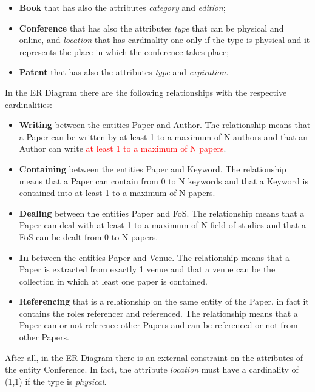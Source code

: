 \documentclass{Configuration_Files/PoliMi3i_thesis}
\begin{document}
\begin{itemize}
\begin{itemize}
            \item \textbf{Book} that has also the attributes \textit{category} and \textit{edition};
            \item \textbf{Conference} that has also the attributes \textit{type} that can be physical and online, and \textit{location} that has cardinality one only if the type is physical and it represents the place in which the conference takes place;
            \item \textbf{Patent} that has also the attributes \textit{type} and \textit{expiration}.
        \end{itemize}
\end{itemize}

In the ER Diagram there are the following relationships with the respective cardinalities:
\begin{itemize}
    \item \textbf{Writing} between the entities Paper and Author. The relationship means that a Paper can be written by at least 1 to a maximum of N authors and that an Author can write \textcolor{red}{at least 1 to a maximum of N papers}.
    \item \textbf{Containing} between the entities Paper and Keyword. The relationship means that a Paper can contain from 0 to N keywords and that a Keyword is contained into at least 1 to a maximum of N papers.
    \item \textbf{Dealing} between the entities Paper and FoS. The relationship means that a Paper can deal with at least 1 to a maximum of N field of studies and that a FoS can be dealt from 0 to N papers. 
    \item \textbf{In} between the entities Paper and Venue. The relationship means that a Paper is extracted from exactly 1 venue and that a venue can be the collection in which at least one paper is contained.
    \item \textbf{Referencing} that is a relationship on the same entity of the Paper, in fact it contains the roles referencer and referenced. The relationship means that a Paper can or not reference other Papers and can be referenced or not from other Papers.
\end{itemize}
After all, in the ER Diagram there is an external constraint on the attributes of the entity Conference. In fact, the attribute \textit{location} must have a cardinality of (1,1) if the type is \textit{physical}. 
\end{document}
